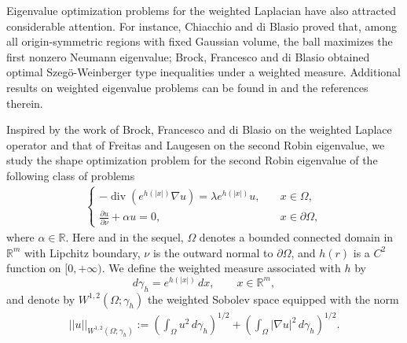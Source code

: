\documentclass[11pt,leqno]{amsart}
\def\a{\alpha}
\def\l{\lambda}
\def\p{\partial}
\def\R{\mathbb{R}}
\def\div{\operatorname{div}}
\def \p {\partial}
\numberwithin{equation}{section}
\begin{document}
Eigenvalue optimization problems for the weighted Laplacian have also attracted  considerable attention. For instance,  Chiacchio and di Blasio \cite{CB12} proved that, among all origin-symmetric regions with  fixed Gaussian volume, the ball maximizes the first nonzero Neumann eigenvalue; Brock, Francesco and di Blasio \cite{BCB16} obtained  optimal  Szeg\"o-Weinberger type inequalities under a weighted measure.
Additional results on weighted eigenvalue problems can be found in \cite{BCHT13, BCKT16, BCB16, CM24, CG22, GW26} and the references therein.


Inspired by the work of Brock, Francesco and di Blasio \cite{BCB16} on the weighted Laplace operator and that of Freitas and Laugesen  \cite{FL21} on the second Robin eigenvalue, we study the shape optimization problem for the second Robin eigenvalue of the following class of problems
\begin{align}\label{eq 1.1}
    \begin{cases}
        -\div (e^{h(|x|)}\nabla u)=\l e^{h(|x|)} u, \quad & x\in \Omega,\\
        \frac{\p u}{\p \nu}+\a u=0, \quad & x\in \p \Omega,
    \end{cases}
\end{align}
where $\a\in \R$. Here and in the sequel, $\Omega$ denotes a bounded connected  domain in $\R^m$ with Lipchitz boundary, $\nu$ is the outward normal to $\p \Omega$, and $h(r)$ is a $C^2$ function on $[0, +\infty)$.  We define the weighted measure associated with $h$ by 
$$
d\gamma_h=e^{h(|x|)}\,dx, \qquad  x\in \R^m,
$$
and denote by $W^{1,2}(\Omega; \gamma_h)$   the weighted Sobolev space equipped with the norm
\begin{align*}
||u||_{W^{1,2}(\Omega;\gamma_h)}:=\left(\int_\Omega u^2 \, d\gamma_h\right)^{1/2}+ \left(\int_\Omega |\nabla u|^2 \, d\gamma_h\right)^{1/2}. 
\end{align*}
\end{document}
